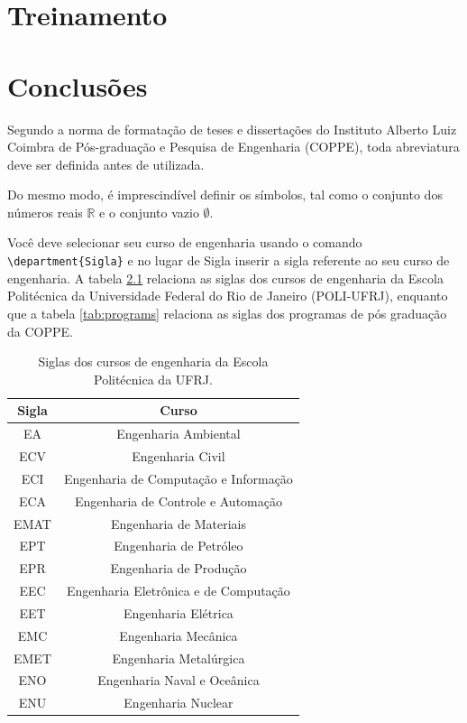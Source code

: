 \documentclass[grad,numbers]{coppe}
\begin{document}
  
  
  \chapter{Treinamento}
  
  
  
  \chapter{Conclusões}
  
  Segundo a norma de formatação de teses e dissertações do
  Instituto Alberto Luiz Coimbra de Pós-graduação e Pesquisa de
  Engenharia (COPPE), toda abreviatura deve ser definida antes de
  utilizada.
  
  Do mesmo modo, é imprescindível definir os símbolos, tal como o
  conjunto dos números reais $\mathbb{R}$ e o conjunto vazio $\emptyset$.
  
  Você deve selecionar seu curso de engenharia usando o comando \texttt{\textbackslash department\{Sigla\}} e no lugar de Sigla inserir a sigla referente ao seu curso de engenharia. A tabela \ref{tab:courses} relaciona as siglas dos cursos de engenharia da Escola Politécnica da Universidade Federal do Rio de Janeiro (POLI-UFRJ), enquanto que a tabela \ref{tab:programs} relaciona as siglas dos programas de pós graduação da COPPE.
  
  
  \begin{table}[h]
  	\caption{Siglas dos cursos de engenharia da Escola Politécnica da UFRJ.}
  	\label{tab:courses}
  	\centering
  	{\footnotesize
  		\begin{tabular}{|c|c|}
  			\hline
  			Sigla & Curso\\
  			\hline
  			EA &  Engenharia Ambiental \\
  			ECV & Engenharia Civil\\
  			ECI & Engenharia de Computação e Informação \\
  			ECA & Engenharia de Controle e Automação \\
  			EMAT & Engenharia de Materiais\\
  			EPT & Engenharia de Petróleo\\
  			EPR & Engenharia de Produção\\
  			EEC & Engenharia Eletrônica e de Computação\\
  			EET & Engenharia Elétrica\\
  			EMC & Engenharia Mecânica\\
  			EMET & Engenharia Metalúrgica\\
  			ENO & Engenharia Naval e Oceânica\\
  			ENU & Engenharia Nuclear\\
  			\hline
  	\end{tabular}}
  \end{table}
  
\end{document}
